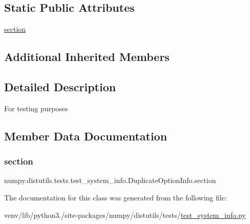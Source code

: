 \subsection*{Static Public Attributes}
\begin{DoxyCompactItemize}
\item 
\hyperlink{classnumpy_1_1distutils_1_1tests_1_1test__system__info_1_1DuplicateOptionInfo_a8ed3d7ee604e48482779d13cf9adffb2}{section}
\end{DoxyCompactItemize}
\subsection*{Additional Inherited Members}


\subsection{Detailed Description}
\begin{DoxyVerb}For testing purposes\end{DoxyVerb}
 

\subsection{Member Data Documentation}
\mbox{\label{classnumpy_1_1distutils_1_1tests_1_1test__system__info_1_1DuplicateOptionInfo_a8ed3d7ee604e48482779d13cf9adffb2}} 
\subsubsection{\texorpdfstring{section}{section}}
{\footnotesize\ttfamily numpy.\+distutils.\+tests.\+test\+\_\+system\+\_\+info.\+Duplicate\+Option\+Info.\+section\hspace{0.3cm}{\ttfamily [static]}}



The documentation for this class was generated from the following file\+:\begin{DoxyCompactItemize}
\item 
venv/lib/python3./site-\/packages/numpy/distutils/tests/\hyperlink{test__system__info_8py}{test\+\_\+system\+\_\+info.\+py}\end{DoxyCompactItemize}
